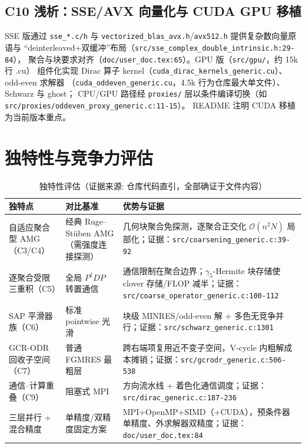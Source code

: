 \documentclass[UTF8]{ctexart}
\begin{document}
\subsection{C10 浅析：SSE/AVX 向量化与 CUDA GPU 移植}
SSE 版通过 \texttt{sse\_*.c/h} 与 \texttt{vectorized\_blas\_avx.h}/\texttt{avx512.h} 提供复杂数向量原语与
``deinterleaved+双缓冲''布局（\texttt{\nolinkurl{src/sse_complex_double_intrinsic.h:29-84}}），
聚合与块要求对齐（\texttt{\nolinkurl{doc/user_doc.tex:65}}）。GPU 版（\texttt{src/gpu/}，约 15k 行 .cu）
组件化实现 Dirac 算子 kernel（\texttt{cuda\_dirac\_kernels\_generic.cu}）、odd-even 求解器
（\texttt{cuda\_oddeven\_generic.cu}，4.5k 行为仓库最大单文件）、Schwarz 与 ghost；
CPU/GPU 路径经 \texttt{proxies/} 层以条件编译切换（如 \texttt{\nolinkurl{src/proxies/oddeven_proxy_generic.c:11-15}}）。
README 注明 CUDA 移植为当前版本重点。

\section{独特性与竞争力评估}
\begin{table}[htbp]\centering
\begin{tabularx}{\textwidth}{lXX}
\toprule
\textcolor{algo}{独特点} & 对比基准 & 优势与证据 \\
\midrule
自适应聚合型 AMG（C3/C4） & 经典 Ruge--Stüben AMG（需强度连接探测） & 几何块聚合免探测，逐聚合正交化 $\mathcal{O}(n^2N)$ 局部化；证据：\texttt{\nolinkurl{src/coarsening_generic.c:39-92}} \\
逐聚合受限三重积（C5） & 全局 $P^\dagger D P$ 转置通信 & 通信限制在聚合边界；$\gamma_5$-Hermite 块存储使 clover 存储/FLOP 减半；证据：\texttt{\nolinkurl{src/coarse_operator_generic.c:100-112}} \\
SAP 平滑器族（C6） & 标准 pointwise 光滑 & 块级 MINRES/odd-even 解 + 多色无竞争并行；证据：\texttt{\nolinkurl{src/schwarz_generic.c:1301}} \\
GCR-ODR 回收子空间（C7） & 普通 FGMRES 最粗层 & 跨右端项复用近不变子空间，V-cycle 内粗解成本摊销；证据：\texttt{\nolinkurl{src/gcrodr_generic.c:506-538}} \\
通信--计算重叠（C9） & 阻塞式 MPI & 方向流水线 + 着色化通信调度；证据：\texttt{\nolinkurl{src/dirac_generic.c:187-236}} \\
三层并行 + 混合精度 & 单精度/双精度固定方案 & MPI+OpenMP+SIMD（+CUDA），预条件器单精度、外求解器双精度；证据：\texttt{\nolinkurl{doc/user_doc.tex:84}} \\
\bottomrule
\end{tabularx}
\caption{独特性评估（证据来源: 仓库代码直引，全部\textcolor{accent}{确证}于文件内容）}
\end{table}
\end{document}
